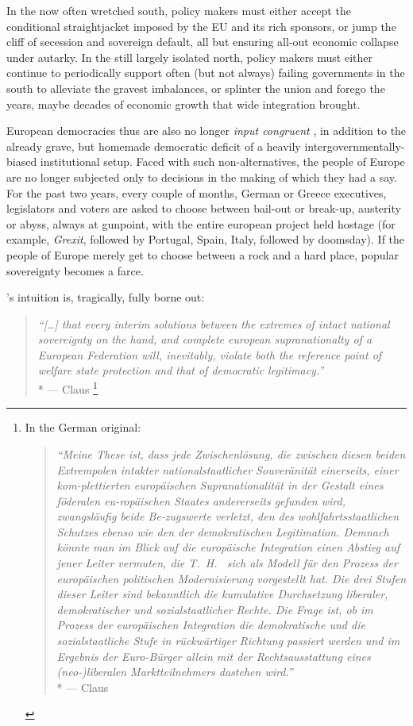 In the now often wretched south, policy makers must either accept the conditional straightjacket imposed by the \gls{EU} and its rich sponsors, or jump the cliff of secession and sovereign default, all but ensuring all-out economic collapse under autarky.
In the still largely isolated north, policy makers must either continue to periodically support often (but not always) failing governments in the south to alleviate the gravest imbalances, or splinter the union and forego the years, maybe decades of economic growth that wide integration brought.

European democracies thus are also no longer \emph{input congruent} \citep{Zurn-2000-aa}, in addition to the already grave, but homemade democratic deficit of a heavily intergovernmentally-biased institutional setup.
Faced with such non-alternatives, the people of Europe are no longer subjected only to decisions in the making of which they had a say.
For the past two years, every couple of months, German or Greece executives, legislators and voters are asked to choose between bail-out or break-up, austerity or abyss, always at gunpoint, with the entire european project held hostage (for example, \emph{Grexit}, followed by Portugal, Spain, Italy, followed by doomsday).
If the people of Europe merely get to choose between a rock and a hard place, popular sovereignty becomes a farce.

\citeauthor{Offe1998}'s \citeyearpar{Offe1998} intuition is, tragically, fully borne out:
\begin{quote}
	\emph{``[\ldots] that every interim solutions between the extremes of intact national sovereignty on the hand, and complete european supranationalty of a European Federation will, inevitably, violate both the reference point of welfare state protection and that of democratic legitimacy.''}
	\\*
	--- Claus \citet[41]{Offe1998}
	\footnote{\label{fn:Offe-regress}
		In the German original:
		\begin{quote}
			\emph{``Meine These ist, dass jede Zwischenlösung, die zwischen diesen beiden Extrempolen intakter nationalstaatlicher Souveränität einerseits, einer kom-plettierten europäischen Supranationalität in der Gestalt eines föderalen eu-ropäischen Staates andererseits gefunden wird, zwangsläufig beide Be-zugswerte verletzt, den des wohlfahrtsstaatlichen Schutzes ebenso wie den der demokratischen Legitimation.
			Demnach könnte man im Blick auf die europäische Integration einen Abstieg auf jener Leiter vermuten, die T.~H.~\cite{Marshall-1950-aa} sich als Modell für den Prozess der europäischen politischen Modernisierung vorgestellt hat.
			Die drei Stufen dieser Leiter sind bekanntlich die kumulative Durchsetzung liberaler, demokratischer und sozialstaatlicher Rechte.
			Die Frage ist, ob im Prozess der europäischen Integration die demokratische und die sozialstaatliche Stufe in rückwärtiger Richtung passiert werden und im Ergebnis der Euro-Bürger allein mit der Rechtsausstattung eines (neo-)liberalen Marktteilnehmers dastehen wird.''}
			\\*
			--- Claus \citet[41]{Offe1998}
		\end{quote}
	}
\end{quote}

